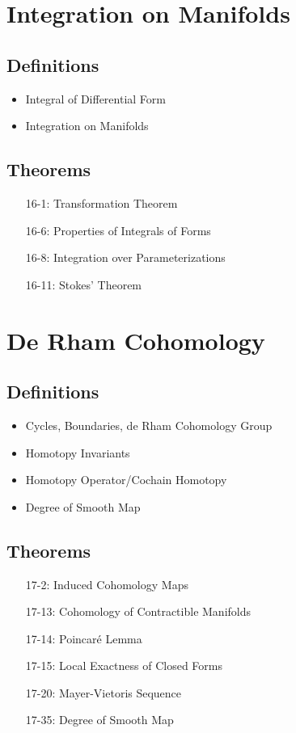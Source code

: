 \documentclass[11.5pt]{scrartcl}
\newcommand{\<}{\langle}
\renewcommand{\>}{\rangle}
\begin{document}
\section{Integration on Manifolds}
\subsection{Definitions}
\begin{itemize}
\item Integral of Differential Form
\item Integration on Manifolds
\end{itemize}
\subsection{Theorems}
\begin{itemize}
\item[16-1:] Transformation Theorem
\item[16-6:] Properties of Integrals of Forms
\item[16-8:] Integration over Parameterizations
\item[16-11:] Stokes' Theorem
\end{itemize}
\section{De Rham Cohomology}
\subsection{Definitions}
\begin{itemize}
\item Cycles, Boundaries, de Rham Cohomology Group
\item Homotopy Invariants
\item Homotopy Operator/Cochain Homotopy
\item Degree of Smooth Map
\end{itemize}

\subsection{Theorems}
\begin{itemize}
\item[17-2:] Induced Cohomology Maps
\item[17-13:] Cohomology of Contractible Manifolds
\item[17-14:] Poincaré Lemma
\item[17-15:] Local Exactness of Closed Forms
\item[17-20:] Mayer-Vietoris Sequence
\item[17-35:] Degree of Smooth Map
\end{itemize}
\end{document}
